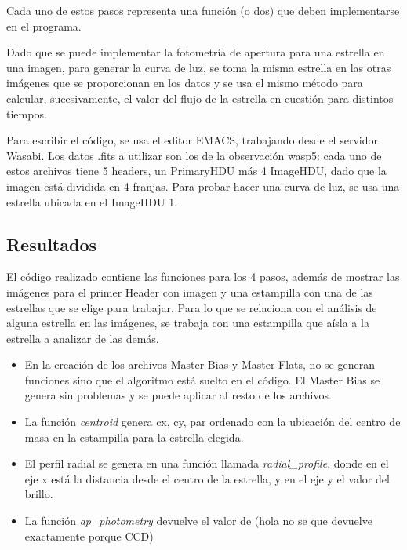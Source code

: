 \documentclass[a4paper, 11pt, spanish]{article}
\begin{document}
Cada uno de estos pasos representa una funci\'on (o dos) que deben implementarse en el programa.

Dado que se puede implementar la fotometr\'ia de apertura para una estrella en una imagen, para generar la curva de luz, se toma la misma estrella en las otras im\'agenes que se proporcionan en los datos y se usa el mismo m\'etodo para calcular, sucesivamente, el valor del flujo de la estrella en cuesti\'on para distintos tiempos.  

Para escribir el c\'odigo, se usa el editor EMACS, trabajando desde el servidor Wasabi. Los datos .fits a utilizar son los de la observaci\'on wasp5: cada uno de estos archivos tiene 5 headers, un PrimaryHDU m\'as 4 ImageHDU, dado que la imagen est\'a dividida en 4 franjas. Para probar hacer una curva de luz, se usa una estrella ubicada en el ImageHDU 1.


\subsection{Resultados}

El c\'odigo realizado contiene las funciones para los 4 pasos, adem\'as de mostrar las im\'agenes para el primer Header con imagen y una estampilla con una de las estrellas que se elige para trabajar. Para lo que se relaciona con el an\'alisis de alguna estrella en las im\'agenes, se trabaja con una estampilla que a\'isla a la estrella a analizar de las dem\'as.

\begin{itemize}
	\item En la creaci\'on de los archivos Master Bias y Master Flats, no se generan funciones sino que el algoritmo est\'a suelto en el c\'odigo. El Master Bias se genera sin problemas y se puede aplicar al resto de los archivos.
	\item La funci\'on \textit{centroid} genera cx, cy, par ordenado con la ubicaci\'on del centro de masa en la estampilla para la estrella elegida. 
	\item El perfil radial se genera en una funci\'on llamada \textit{radial\_profile}, donde en el eje x est\'a la distancia desde el centro de la estrella, y en el eje y el valor del brillo. 
	\item La funci\'on \textit{ap\_photometry} devuelve el valor de (hola no se que devuelve exactamente porque CCD)
\end{itemize}
\end{document}
